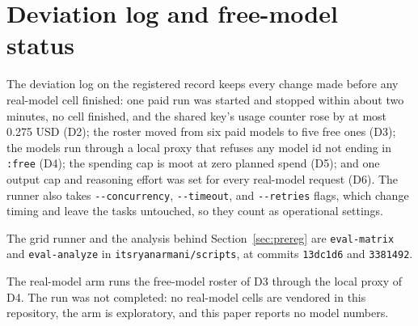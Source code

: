 \section{Deviation log and free-model status}
\label{app:deviations}

The deviation log on the registered record keeps every change made before any real-model cell finished: one paid run was started and stopped within about two minutes, no cell finished, and the shared key's usage counter rose by at most 0.275 USD (D2); the roster moved from six paid models to five free ones (D3); the models run through a local proxy that refuses any model id not ending in \texttt{:free} (D4); the spending cap is moot at zero planned spend (D5); and one output cap and reasoning effort was set for every real-model request (D6). The runner also takes \texttt{-{}-concurrency}, \texttt{-{}-timeout}, and \texttt{-{}-retries} flags, which change timing and leave the tasks untouched, so they count as operational settings.

The grid runner and the analysis behind Section~\ref{sec:prereg} are \texttt{eval-matrix} and \texttt{eval-analyze} in \texttt{itsryanarmani/scripts}, at commits \texttt{13dc1d6} and \texttt{3381492}.

The real-model arm runs the free-model roster of D3 through the local proxy of D4. The run was not completed: no real-model cells are vendored in this repository, the arm is exploratory, and this paper reports no model numbers.
